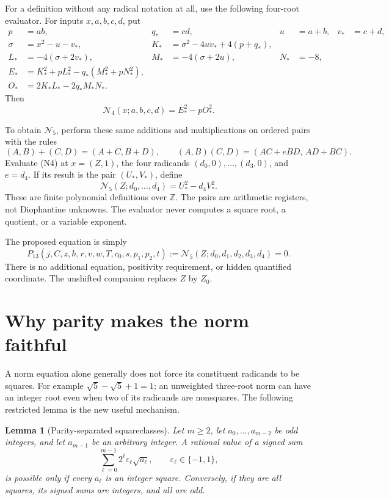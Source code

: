 \documentclass[11pt]{article}
\newcommand{\Z}{\mathbb Z}
\newcommand{\Nm}{\mathcal N}
\newtheorem{lemma}[theorem]{Lemma}
\theoremstyle{remark}
\begin{document}
\begin{minipage}{\linewidth}
For a definition without any radical notation at all, use the following
four-root evaluator. For inputs \(x,a,b,c,d\), put
\begin{align*}
 p&=ab,&q_*&=cd,&u&=a+b,&v_*&=c+d,\\
 \sigma&=x^2-u-v_*,&
 K_*&=\sigma^2-4uv_*+4(p+q_*),\\
 L_*&=-4(\sigma+2v_*),&
 M_*&=-4(\sigma+2u),&N_*&=-8,\\
 E_*&=K_*^2+pL_*^2-q_*(M_*^2+pN_*^2),\\
 O_*&=2K_*L_*-2q_*M_*N_* .
\end{align*}
Then
\[
 \Nm_4(x;a,b,c,d)=E_*^2-pO_*^2.                              \tag{N4}
\]
\end{minipage}
\medskip

To obtain \(\Nm_5\), perform these same additions and multiplications on
ordered pairs with the rules
\[
 (A,B)+(C,D)=(A+C,B+D),\qquad
 (A,B)(C,D)=(AC+eBD,\,AD+BC).
\]
Evaluate (N4) at \(x=(Z,1)\), the four radicands
\((d_0,0),\ldots,(d_3,0)\), and \(e=d_4\). If its result is the pair
\((U_*,V_*)\), define
\[
 \boxed{\Nm_5(Z;d_0,\ldots,d_4)=U_*^2-d_4V_*^2.}              \tag{N5}
\]
These are finite polynomial definitions over \(\Z\). The pairs are
arithmetic registers, not Diophantine unknowns. The evaluator never computes
a square root, a quotient, or a variable exponent.

The proposed equation is simply
\begin{equation}
 \boxed{P_{13}(j,C,z,h,r,v,w,T,c_0,s,p_1,p_2,t)
       :=\Nm_5(Z;d_0,d_1,d_2,d_3,d_4)=0.}                   \label{eq:main}
\end{equation}
There is no additional equation, positivity requirement, or hidden quantified
coordinate. The unshifted companion replaces \(Z\) by \(Z_0\).

\section{Why parity makes the norm faithful}

A norm equation alone generally does not force its constituent radicands
to be squares. For example \(\sqrt5-\sqrt5+1=1\); an unweighted
three-root norm can have an integer root even when two of its radicands are
nonsquares. The following restricted lemma is the new useful mechanism.

\begin{lemma}[Parity-separated squareclasses]\label{lem:parity}
Let \(m\ge 2\), let \(a_0,\ldots,a_{m-2}\) be odd integers, and let \(a_{m-1}\) be an arbitrary
integer. A rational value of a signed sum
\[
 \sum_{\ell=0}^{m-1}2^\ell\varepsilon_\ell\sqrt{a_\ell},
 \qquad \varepsilon_\ell\in\{-1,1\},
\]
is possible only if every \(a_\ell\) is an integer square.
Conversely, if they are all squares, its signed sums are integers, and all
are odd.
\end{lemma}
\end{document}
